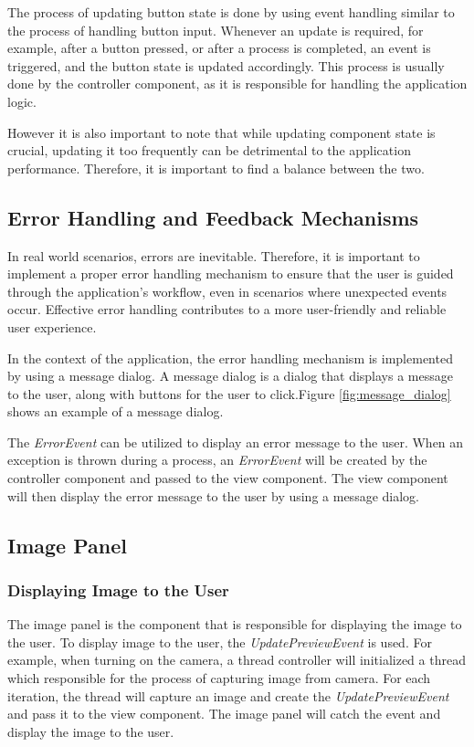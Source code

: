 The process of updating button state is done by using event handling similar to the process of handling button input. Whenever an update is required, for example, after a button pressed, or after a process is completed, an event is triggered, and the button state is updated accordingly. This process is usually done by the controller component, as it is responsible for handling the application logic.

However it is also important to note that while updating component state is crucial, updating it too frequently can be detrimental to the application performance. Therefore, it is important to find a balance between the two.

\subsection{Error Handling and Feedback Mechanisms}
\label{subsec:error_handling_and_feedback_mechanisms}
In real world scenarios, errors are inevitable. Therefore, it is important to implement a proper error handling mechanism to ensure that the user is guided through the application's workflow, even in scenarios where unexpected events occur. Effective error handling contributes to a more user-friendly and reliable user experience.

In the context of the application, the error handling mechanism is implemented by using a message dialog. A message dialog is a dialog that displays a message to the user, along with buttons for the user to click.Figure \ref{fig:message_dialog} shows an example of a message dialog.

The \textit{ErrorEvent} can be utilized to display an error message to the user. When an exception is thrown during a process, an \textit{ErrorEvent} will be created by the controller component and passed to the view component. The view component will then display the error message to the user by using a message dialog.


\subsection{Image Panel}
\label{subsec:image_panel}

\subsubsection{Displaying Image to the User}
The image panel is the component that is responsible for displaying the image to the user. To display image to the user, the \textit{UpdatePreviewEvent} is used. For example, when turning on the camera, a thread controller will initialized a thread which responsible for the process of capturing image from camera. For each iteration, the thread will capture an image and create the \textit{UpdatePreviewEvent} and pass it to the view component. The image panel will catch the event and display the image to the user.

